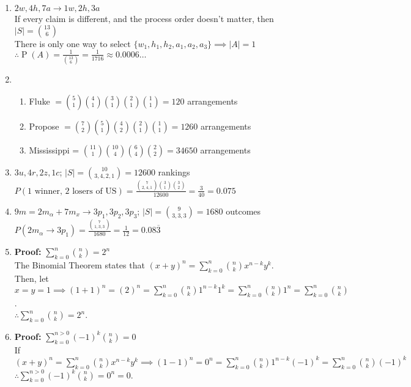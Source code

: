 \documentclass{article}
\newcommand{\proof}[1]{\textbf{Proof: #1}}
\newcommand{\set}[1]{\{#1\}}
\newcommand{\pr}[1]{\operatorname{P}(#1)}
\begin{document}
\begin{enumerate}
  \item $2w, 4h, 7a \to 1w, 2h, 3a$\\
  If every claim is different, and the process order doesn't matter, then $|S| = \binom{13}{6}$\\
  There is only one way to select $\set{w_1, h_1, h_2, a_1, a_2, a_3} \implies |A| = 1$\\
  $\therefore \pr{A} = \frac{1}{\binom{13}{6}} = \frac{1}{1716} \approx 0.0006\ldots$
  
  \newpage
  \item \begin{enumerate}
    \item Fluke $=\binom{5}{1}\binom{4}{1}\binom{3}{1}\binom{2}{1}\binom{1}{1} = 120$ arrangements
    \item Propose $= \binom{7}{2}\binom{5}{1}\binom{4}{2}\binom{2}{1}\binom{1}{1} = 1260$ arrangements
    \item Mississippi = $\binom{11}{1}\binom{10}{4}\binom{6}{4}\binom{2}{2} = 34650$ arrangements
  \end{enumerate}
  
  \item $3u, 4r, 2z, 1c$; $|S| = \binom{10}{3,4,2,1} = 12600$ rankings\\
  $P(\text{1 winner, 2 losers of US}) = \frac{\binom{7}{2,4,1}\binom{3}{1}\binom{3}{2}}{12600} = \frac{3}{40} = 0.075$
  
  \item $9m = 2m_\alpha + 7m_x \to 3p_1, 3p_2, 3p_3$; $|S| = \binom{9}{3,3,3} = 1680$ outcomes\\
  $P(2m_\alpha \to 3p_1) = \frac{\binom{7}{1,3,3}}{1680} = \frac{1}{12} = 0.08\overline{3}$
  
  \item \proof{}$\sum_{k=0}^{n}\binom{n}{k} = 2^n$\\
  The Binomial Theorem states that $(x+y)^n = \sum_{k=0}^{n}\binom{n}{k}x^{n-k}y^k$.\\
  Then, let $x=y=1 \implies (1+1)^n = (2)^n = \sum_{k=0}^{n}\binom{n}{k}1^{n-k}1^k = \sum_{k=0}^{n}\binom{n}{k}1^n = \sum_{k=0}^{n}\binom{n}{k}$.\\
  $\therefore \sum_{k=0}^{n}\binom{n}{k} = 2^n$.
  
  \item \proof{} $\sum_{k=0}^{n>0}(-1)^k\binom{n}{k} = 0$\\
  If $(x+y)^n = \sum_{k=0}^{n}\binom{n}{k}x^{n-k}y^k \implies (1 - 1)^n = 0^n = \sum_{k=0}^{n}\binom{n}{k}1^{n-k}(-1)^k = \sum_{k=0}^{n}\binom{n}{k}(-1)^k$\\
  $\therefore \sum_{k=0}^{n>0}(-1)^k\binom{n}{k} = 0^n = 0$.
  
\end{enumerate}
\end{document}
